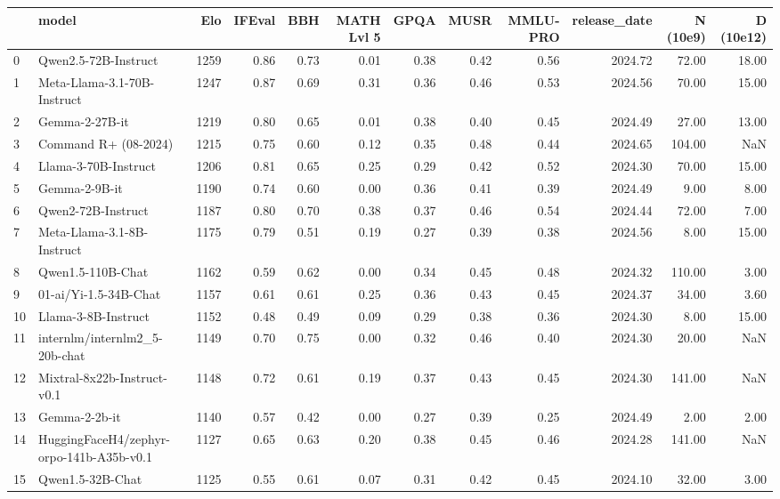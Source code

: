 \begin{tiny}
    \begin{tabular}{llrrrrrrrrrr}
    \toprule
     & model & Elo & IFEval & BBH & MATH Lvl 5 & GPQA & MUSR & MMLU-PRO & release\_date & N (10e9) & D (10e12) \\
    \midrule
    0 & Qwen2.5-72B-Instruct & 1259 & 0.86 & 0.73 & 0.01 & 0.38 & 0.42 & 0.56 & 2024.72 & 72.00 & 18.00 \\
    1 & Meta-Llama-3.1-70B-Instruct & 1247 & 0.87 & 0.69 & 0.31 & 0.36 & 0.46 & 0.53 & 2024.56 & 70.00 & 15.00 \\
    2 & Gemma-2-27B-it & 1219 & 0.80 & 0.65 & 0.01 & 0.38 & 0.40 & 0.45 & 2024.49 & 27.00 & 13.00 \\
    3 & Command R+ (08-2024) & 1215 & 0.75 & 0.60 & 0.12 & 0.35 & 0.48 & 0.44 & 2024.65 & 104.00 & NaN \\
    4 & Llama-3-70B-Instruct & 1206 & 0.81 & 0.65 & 0.25 & 0.29 & 0.42 & 0.52 & 2024.30 & 70.00 & 15.00 \\
    5 & Gemma-2-9B-it & 1190 & 0.74 & 0.60 & 0.00 & 0.36 & 0.41 & 0.39 & 2024.49 & 9.00 & 8.00 \\
    6 & Qwen2-72B-Instruct & 1187 & 0.80 & 0.70 & 0.38 & 0.37 & 0.46 & 0.54 & 2024.44 & 72.00 & 7.00 \\
    7 & Meta-Llama-3.1-8B-Instruct & 1175 & 0.79 & 0.51 & 0.19 & 0.27 & 0.39 & 0.38 & 2024.56 & 8.00 & 15.00 \\
    8 & Qwen1.5-110B-Chat & 1162 & 0.59 & 0.62 & 0.00 & 0.34 & 0.45 & 0.48 & 2024.32 & 110.00 & 3.00 \\
    9 & 01-ai/Yi-1.5-34B-Chat & 1157 & 0.61 & 0.61 & 0.25 & 0.36 & 0.43 & 0.45 & 2024.37 & 34.00 & 3.60 \\
    10 & Llama-3-8B-Instruct & 1152 & 0.48 & 0.49 & 0.09 & 0.29 & 0.38 & 0.36 & 2024.30 & 8.00 & 15.00 \\
    11 & internlm/internlm2\_5-20b-chat & 1149 & 0.70 & 0.75 & 0.00 & 0.32 & 0.46 & 0.40 & 2024.30 & 20.00 & NaN \\
    12 & Mixtral-8x22b-Instruct-v0.1 & 1148 & 0.72 & 0.61 & 0.19 & 0.37 & 0.43 & 0.45 & 2024.30 & 141.00 & NaN \\
    13 & Gemma-2-2b-it & 1140 & 0.57 & 0.42 & 0.00 & 0.27 & 0.39 & 0.25 & 2024.49 & 2.00 & 2.00 \\
    14 & HuggingFaceH4/zephyr-orpo-141b-A35b-v0.1 & 1127 & 0.65 & 0.63 & 0.20 & 0.38 & 0.45 & 0.46 & 2024.28 & 141.00 & NaN \\
    15 & Qwen1.5-32B-Chat & 1125 & 0.55 & 0.61 & 0.07 & 0.31 & 0.42 & 0.45 & 2024.10 & 32.00 & 3.00 \\

\end{tabular}
\end{tiny}
